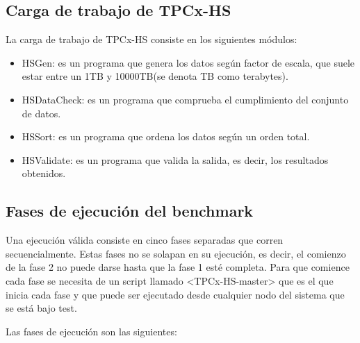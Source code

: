 \documentclass[10pt]{article}
\begin{document}
\subsection{Carga de trabajo de TPCx-HS}

	La carga de trabajo de TPCx-HS consiste en los siguientes módulos:
	
	\begin{itemize}
		\item HSGen: es un programa que genera los datos según factor de escala, que suele estar entre un 1TB y 10000TB(se denota TB como terabytes).
		\item HSDataCheck: es un programa que comprueba el cumplimiento del conjunto de datos.
		\item HSSort: es un programa que ordena los datos según un orden total.
		\item HSValidate: es un programa que valida la salida, es decir, los resultados obtenidos.
	\end{itemize}
	
	\subsection{Fases de ejecución del benchmark}
		
	Una ejecución válida consiste en cinco fases separadas que corren secuencialmente. Estas fases no se solapan en su ejecución, es decir, el comienzo de la fase 2 no puede darse hasta que la fase 1 esté completa. Para que comience cada fase se necesita de un script llamado <TPCx-HS-master> que es el que inicia cada fase y que puede ser ejecutado desde cualquier nodo del sistema que se está bajo test.
	
	Las fases de ejecución son las siguientes:
		
\end{document}
